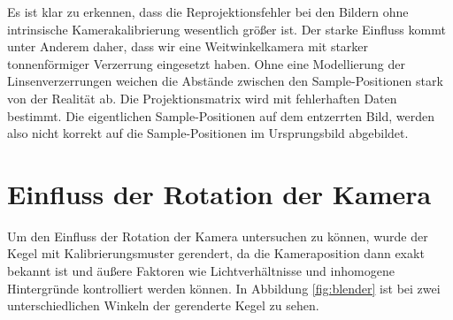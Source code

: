 Es ist klar zu erkennen, dass die Reprojektionsfehler bei den Bildern ohne intrinsische Kamerakalibrierung wesentlich größer ist. Der starke Einfluss kommt unter Anderem daher, dass wir eine Weitwinkelkamera mit starker tonnenförmiger Verzerrung eingesetzt haben. Ohne eine Modellierung der Linsenverzerrungen weichen die Abstände zwischen den Sample-Positionen stark von der Realität ab. Die Projektionsmatrix wird mit fehlerhaften Daten bestimmt. Die eigentlichen Sample-Positionen auf dem entzerrten Bild, werden also nicht korrekt auf die Sample-Positionen im Ursprungsbild abgebildet. 

\section{Einfluss der Rotation der Kamera}
Um den Einfluss der Rotation der Kamera untersuchen zu können, wurde der Kegel mit Kalibrierungsmuster gerendert, da die Kameraposition dann exakt bekannt ist und äußere Faktoren wie Lichtverhältnisse und inhomogene Hintergründe kontrolliert werden können. In Abbildung \ref{fig:blender} ist bei zwei unterschiedlichen Winkeln der gerenderte Kegel zu sehen. 


